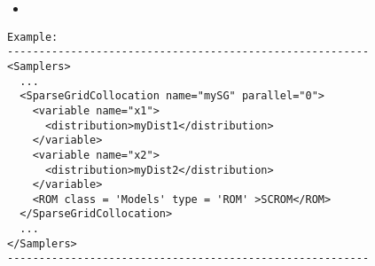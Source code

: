 \begin{itemize}

  \item \assemblerROMDescription

\end{itemize}
\footnotesize
\begin{lstlisting}[style=XML]
Example:
---------------------------------------------------------
<Samplers>
  ...
  <SparseGridCollocation name="mySG" parallel="0">
    <variable name="x1">
      <distribution>myDist1</distribution>
    </variable>
    <variable name="x2">
      <distribution>myDist2</distribution>
    </variable>
    <ROM class = 'Models' type = 'ROM' >SCROM</ROM>
  </SparseGridCollocation>
  ...
</Samplers>
---------------------------------------------------------
\end{lstlisting}
 \normalsize
 
